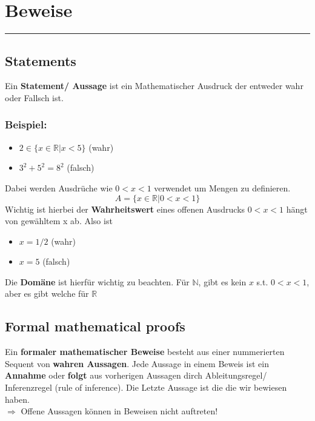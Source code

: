 \newcommand{\defbox}[2]{
\vspace{1cm}
\noindent
  \begin{tcolorbox}[colframe=red, colback=white, width=\linewidth, title=#1]
    #2
  \end{tcolorbox}
  \vspace{1cm}
}

\newcommand{\proofbox}[4]{%
    \begin{proof}
        \textbf{#1:} #2\textbf{Zeige:} #3
        \begin{align*}
        #4
        \end{align*}
    \end{proof}
}

\section{Beweise}
\rule{\textwidth}{0.4pt}
\subsection{Statements} Ein \textbf{Statement/ Aussage} ist ein Mathematischer Ausdruck der entweder wahr oder Fallsch ist. 
\subsubsection*{Beispiel: } 
\begin{itemize}
    \item $2 \in \{x \in \mathbb{R} \vert x < 5\}$ (wahr)
    \item $3^2 + 5^2 = 8^2$ (falsch)
\end{itemize} 
Dabei werden Ausdrüche wie $0 < x < 1$ verwendet um Mengen zu definieren. \[A = \{x\in\mathbb{R} \vert 0 < x < 1\}\] Wichtig ist hierbei der \textbf{Wahrheitswert} eines offenen Ausdrucks $0 < x < 1$ hängt von gewähltem x ab. Also ist 
\begin{itemize}
    \item $x = 1/2$ (wahr) 
    \item $x = 5 $ (falsch)
\end{itemize}
Die \textbf{Domäne} ist hierfür wichtig zu beachten. Für $\mathbb{N}$, gibt es kein $x$ s.t. $0 < x < 1$, aber es gibt welche für $\mathbb{R}$

\subsection{Formal mathematical proofs} Ein \textbf{formaler mathematischer Beweise} besteht aus einer nummerierten Sequent von \textbf{wahren Aussagen}. Jede Aussage in einem Beweis ist ein \textbf{Annahme} oder \textbf{folgt} aus vorherigen Aussagen dirch Ableitungsregel/ Inferenzregel (rule of inference). Die Letzte Aussage ist die die wir bewiesen haben.\\
$\Rightarrow$ Offene Aussagen können in Beweisen nicht auftreten!

